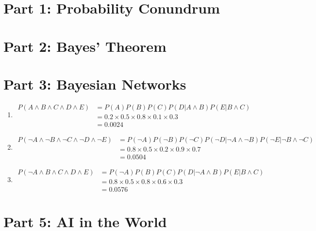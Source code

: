 \documentclass[11pt]{amsart}
\begin{document}
\maketitle

\section*{Part 1: Probability Conundrum}

\section*{Part 2: Bayes' Theorem}

\section*{Part 3: Bayesian Networks}

\begin{enumerate}

\item
\begin{align*}
P(A \wedge B \wedge C \wedge D \wedge E)
	&= P(A) P(B) P(C) P(D | A \wedge B) P(E | B \wedge C) \\
	&= 0.2 \times 0.5 \times 0.8 \times 0.1 \times 0.3 \\
	&= 0.0024
\end{align*}

\item
\begin{align*}
P(\neg A \wedge \neg B \wedge \neg C \wedge \neg D \wedge \neg E)
	&= P(\neg A) P(\neg B) P(\neg C) P(\neg D | \neg A \wedge \neg B) P(\neg E | \neg B \wedge \neg C) \\
	&= 0.8 \times 0.5 \times 0.2 \times 0.9 \times 0.7 \\
	&= 0.0504
\end{align*}

\item
\begin{align*}
P(\neg A \wedge B \wedge C \wedge D \wedge E)
	&= P(\neg A) P(B) P(C) P(D | \neg A \wedge B) P(E | B \wedge C) \\
	&= 0.8 \times 0.5 \times 0.8 \times 0.6 \times 0.3 \\
	&= 0.0576
\end{align*}

\end{enumerate}

\section*{Part 5: AI in the World}
\end{document}
